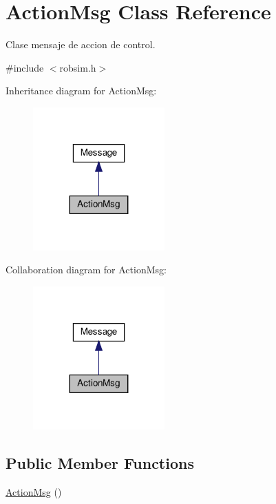 \hypertarget{classActionMsg}{}\section{Action\+Msg Class Reference}
\label{classActionMsg}


Clase mensaje de accion de control.  




{\ttfamily \#include $<$robsim.\+h$>$}



Inheritance diagram for Action\+Msg\+:\nopagebreak
\begin{figure}[H]
\begin{center}
\leavevmode
\includegraphics[width=143pt]{classActionMsg__inherit__graph}
\end{center}
\end{figure}


Collaboration diagram for Action\+Msg\+:\nopagebreak
\begin{figure}[H]
\begin{center}
\leavevmode
\includegraphics[width=143pt]{classActionMsg__coll__graph}
\end{center}
\end{figure}
\subsection*{Public Member Functions}
\begin{DoxyCompactItemize}
\item 
\hyperlink{classActionMsg_ab22c6cee704bd1ee2dbcbf54dd16cc4c}{Action\+Msg} ()
\end{DoxyCompactItemize}
